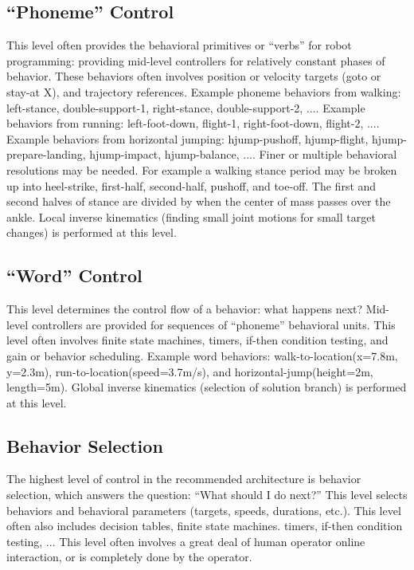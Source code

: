 \documentclass[letterpaper,12pt,fullpage]{article}
\begin{document}
\subsection{``Phoneme'' Control}

This level often provides the behavioral primitives or ``verbs'' for robot programming:
providing mid-level controllers
for relatively constant phases of behavior.
These behaviors often involves position or velocity targets (goto or
stay-at X), and trajectory references.
Example phoneme behaviors from walking: left-stance, double-support-1, right-stance, double-support-2, ....
Example behaviors from running: left-foot-down, flight-1, right-foot-down, flight-2, ....
Example behaviors from horizontal jumping: hjump-pushoff, hjump-flight, hjump-prepare-landing, hjump-impact, hjump-balance, ....
Finer or multiple behavioral resolutions may be needed.
For example a walking stance period may
be broken up into heel-strike, first-half, second-half, pushoff, and toe-off.
The first and second halves of stance are divided by when the center of mass
passes over the ankle.
Local inverse kinematics (finding small joint motions for small target changes)
is performed at this level.

\subsection{``Word'' Control}

This level determines the control flow of a behavior: what happens next?
Mid-level controllers are provided for sequences of ``phoneme'' behavioral
units.
This level often involves finite state machines, timers, if-then condition testing,
and gain or behavior
scheduling.
Example word behaviors: walk-to-location(x=7.8m, y=2.3m), run-to-location(speed=3.7m/s),
and horizontal-jump(height=2m, length=5m).
Global inverse kinematics (selection of solution branch) is performed at this level.

\subsection{Behavior Selection}

The highest level of control in the recommended architecture is behavior selection,
which answers the question:
``What should I do next?''
This level selects behaviors and behavioral parameters (targets,
speeds, durations, etc.).
This level often also 
includes decision tables, finite state machines. timers, if-then condition testing, ...
This level often involves a great deal of human operator online interaction,
or is completely done by the operator.
\end{document}

